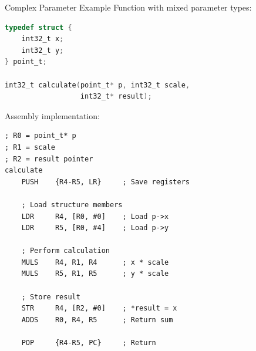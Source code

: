 \begin{example2}{Complex Parameter Example}
Function with mixed parameter types:
\begin{lstlisting}[language=C, style=basesmol]
typedef struct {
    int32_t x;
    int32_t y;
} point_t;

int32_t calculate(point_t* p, int32_t scale, 
                  int32_t* result);
\end{lstlisting}

Assembly implementation:
\begin{lstlisting}[language=armasm, style=basesmol]
; R0 = point_t* p
; R1 = scale
; R2 = result pointer
calculate
    PUSH    {R4-R5, LR}     ; Save registers
    
    ; Load structure members
    LDR     R4, [R0, #0]    ; Load p->x
    LDR     R5, [R0, #4]    ; Load p->y
    
    ; Perform calculation
    MULS    R4, R1, R4      ; x * scale
    MULS    R5, R1, R5      ; y * scale
    
    ; Store result
    STR     R4, [R2, #0]    ; *result = x
    ADDS    R0, R4, R5      ; Return sum
    
    POP     {R4-R5, PC}     ; Return
\end{lstlisting}
\end{example2}

